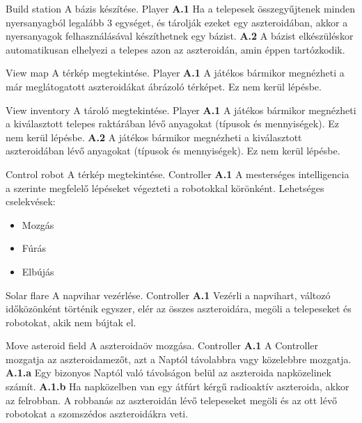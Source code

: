 \documentclass[../../projlab]{subfiles}
\begin{document}
\begin{use-case}
	{Build station}
	{A bázis készítése.}
	{Player}
    \textbf{A.1} Ha a telepesek összegyűjtenek minden nyersanyagból legalább 3 egységet, és tárolják ezeket egy aszteroidában, akkor a nyersanyagok felhasználásával készíthetnek egy bázist.
	\newline
	\textbf{A.2} A bázist elkészüléskor automatikusan elhelyezi a telepes azon az aszteroidán, amin éppen tartózkodik.
\end{use-case}

\begin{use-case}
	{View map}
	{A térkép megtekintése.}
	{Player}
    \textbf{A.1} A játékos bármikor megnézheti a már meglátogatott aszteroidákat ábrázoló térképet. Ez nem kerül lépésbe.
\end{use-case}

\begin{use-case}
	{View inventory}
	{A tároló megtekintése.}
	{Player}
    \textbf{A.1} A játékos bármikor megnézheti a kiválasztott telepes raktárában lévő anyagokat (típusok és mennyiségek).  Ez nem kerül lépésbe.
	\newline
	\textbf{A.2} A játékos bármikor megnézheti a kiválasztott aszteroidában lévő anyagokat (típusok és mennyiségek).  Ez nem kerül lépésbe.
\end{use-case}

\begin{use-case}
	{Control robot}
	{A térkép megtekintése.}
	{Controller}
    \textbf{A.1} A mesterséges intelligencia a szerinte megfelelő lépéseket végezteti a robotokkal körönként.
	\newline
	Lehetséges cselekvések:
	\begin{itemize}
		\item Mozgás
		\item Fúrás
		\item Elbújás
	\end{itemize}
		
\end{use-case}

\begin{use-case}
	{Solar flare}
	{A napvihar vezérlése.}
	{Controller}
    \textbf{A.1} Vezérli a napvihart, változó időközönként történik egyszer, elér az összes aszteroidára, megöli a telepeseket és robotokat, akik nem bújtak el.
\end{use-case}

\begin{use-case}
	{Move asteroid field}
	{A aszteroidaöv mozgása.}
	{Controller}
    \textbf{A.1} A Controller mozgatja az aszteroidamezőt, azt a Naptól távolabbra vagy közelebbre mozgatja.
	\newline
	\textbf{A.1.a} Egy bizonyos Naptól való távolságon belül az aszteroida napközelinek számít.
	\newline
	\textbf{A.1.b} Ha napközelben van egy átfúrt kérgű radioaktív aszteroida, akkor az felrobban. A robbanás az aszteroidán lévő telepeseket megöli és az ott lévő robotokat a szomszédos aszteroidákra veti.
\end{use-case}
\end{document}
